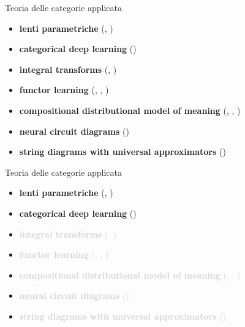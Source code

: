 \documentclass{beamer}
\begin{document}
\begin{frame}{Teoria delle categorie applicata}
    \begin{itemize}
        \item<1-> \textbf{lenti parametriche} {\footnotesize (\cite{gavranovic2024fundamental}, \cite{cruttwell2022categorical})}
        \item<2-> \textbf{categorical deep learning}{ \footnotesize(\cite{gavranovicposition})}
        \item<3-> \textbf{integral transforms} {\footnotesize(\cite{dudzik2022graph}, \cite{dudzik2024asynchronous})}
        \item<4-> \textbf{functor learning} {\footnotesize(\cite{gavranovic2019compositional}, \cite{sheshmani2021categorical}, \cite{chytas2024poolingimagedatasetsmultiple})}
        \item<5-> \textbf{compositional distributional model of meaning} {\footnotesize(\cite{clark2007combining}, \cite{coecke2010mathematical}, \cite{lewis2019compositionality})}
        \item<6-> \textbf{neural circuit diagrams} {\footnotesize(\cite{abbott2023robust})}
        \item<7-> \textbf{string diagrams with universal approximators} {\footnotesize(\cite{khatri2024anatomy})}
    \end{itemize}
\end{frame}

\begin{frame}{Teoria delle categorie applicata}
    \begin{itemize}
        \item \textbf{lenti parametriche} {\footnotesize (\cite{gavranovic2024fundamental}, \cite{cruttwell2022categorical})}
        \item \textbf{categorical deep learning}{ \footnotesize(\cite{gavranovicposition})}
        \item \textcolor{lightgray}{\textbf{integral transforms} {\footnotesize(\cite{dudzik2022graph}, \cite{dudzik2024asynchronous})}}
        \item \textcolor{lightgray}{\textbf{functor learning} {\footnotesize(\cite{gavranovic2019compositional}, \cite{sheshmani2021categorical}, \cite{chytas2024poolingimagedatasetsmultiple})}}
        \item \textcolor{lightgray}{\textbf{compositional distributional model of meaning} {\footnotesize(\cite{clark2007combining}, \cite{coecke2010mathematical}, \cite{lewis2019compositionality})}}
        \item \textcolor{lightgray}{\textbf{neural circuit diagrams} {\footnotesize(\cite{abbott2023robust})}}
        \item \textcolor{lightgray}{\textbf{string diagrams with universal approximators} {\footnotesize(\cite{khatri2024anatomy})}}
    \end{itemize}
\end{frame}
\end{document}
